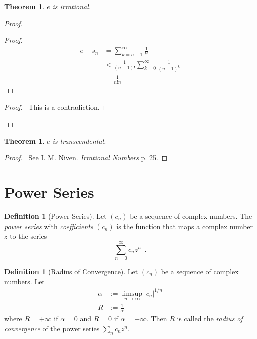 \documentclass{book}
\let\qed\relax
\newtheorem{thm}[prop]{Theorem}
\theoremstyle{definition}
\newtheorem{df}[prop]{Definition}
\begin{document}
\begin{thm}
$e$ is irrational.
\end{thm}

\begin{proof}
\pf
{}
\begin{proof}
	\pf
	\begin{align*}
		e - s_n & = \sum_{k=n+1}^\infty \frac{1}{k!} \\
		& < \frac{1}{(n+1)!} \sum_{k=0}^\infty \frac{1}{(n+1)^k} \\
		& = \frac{1}{n!n}
	\end{align*}
\end{proof}
\qedstep
\begin{proof}
	\pf\ This is a contradiction.
\end{proof}
\qed
\end{proof}

\begin{thm}
$e$ is transcendental.
\end{thm}

\begin{proof}
\pf\ See I. M. Niven. \emph{Irrational Numbers} p. 25. \qed
\end{proof}

\section{Power Series}

\begin{df}[Power Series]
Let $(c_n)$ be a sequence of complex numbers. The \emph{power series} with \emph{coefficients} $(c_n)$ is the function that maps a complex number $z$ to the series
\[ \sum_{n=0}^\infty c_n z^n \enspace . \]
\end{df}

\begin{df}[Radius of Convergence]
Let $(c_n)$ be a sequence of complex numbers. Let
\begin{align*}
\alpha & := \limsup_{n \rightarrow \infty} |c_n|^{1/n} \\
R & := \frac{1}{\alpha}
\end{align*}
where $R = + \infty$ if $\alpha = 0$ and $R = 0$ if $\alpha = + \infty$. Then $R$ is called the \emph{radius of convergence} of the power series $\sum_n c_n z^n$.
\end{df}
\end{document}
